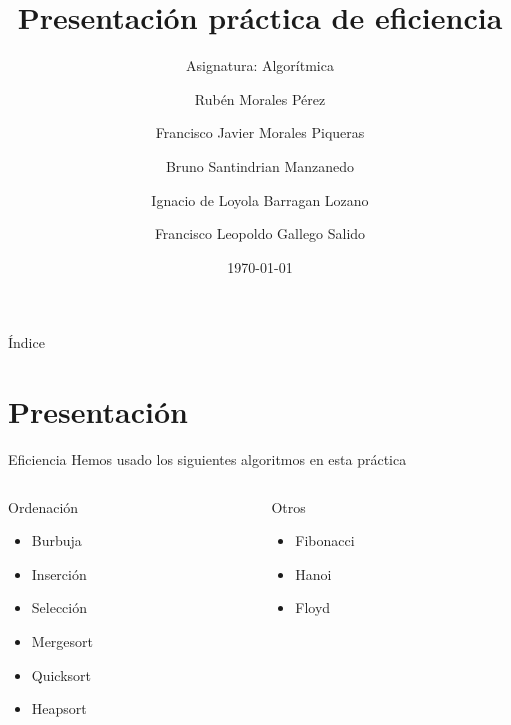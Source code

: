 \documentclass[compress]{beamer}
\title{Presentación práctica de eficiencia}                                               %
\subtitle{Asignatura: Algorítmica}                                  %
\author{Rubén Morales Pérez
		\and Francisco Javier Morales Piqueras
		\and Bruno Santindrian Manzanedo
		\and Ignacio de Loyola Barragan Lozano
		\and Francisco Leopoldo Gallego Salido}
\date{\today}                                                            %
\begin{document}
\begin{frame}
\titlepage
\end{frame}
\begin{frame}{Índice}
  \hypertarget{index}{}
  \tableofcontents
\end{frame}


\section{Presentación}
\begin{frame}
	\begin{block}{Eficiencia}
	Hemos usado los siguientes algoritmos en esta práctica
	\end{block}
	
\begin{columns}  
\begin{column}{5cm}   
	\vspace*{1cm}
	\begin{block}{Ordenaci\'on} 
	\begin{itemize}
		\item Burbuja
		\item Inserción
		\item Selección
		\item Mergesort
		\item Quicksort
		\item Heapsort
	\end{itemize}      
	\end{block}            
\end{column}	

\begin{column}{5cm} 
	\begin{block}{Otros}
	\begin{itemize}
		\item Fibonacci
		\item Hanoi
		\item Floyd
	\end{itemize}    
	\end{block}	                 
\end{column}  
\end{columns}	
\end{frame}
\end{document}

